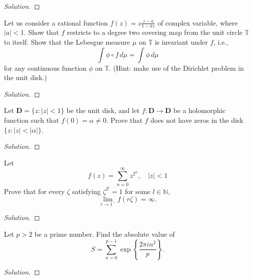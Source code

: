 \documentclass[10pt]{article}
\newenvironment{soln}{\begin{proof}[Solution]}{\end{proof}}
\begin{document}
\begin{soln}

\end{soln}



\begin{problem}
[2007 A-I-6]
Let us consider a rational function $f(z)=z \frac{z-a}{1-\bar{a} z}$ of complex variable, where $|a|<1$. Show that $f$ restricts to a degree two covering map from the unit circle $\mathbb{T}$ to itself. Show that the Lebesgue measure $\mu$ on $\mathbb{T}$ is invariant under $f$, i.e.,
$$
\int \phi \circ f\, d \mu=\int \phi\, d \mu
$$
for any continuous function $\phi$ on $\mathbb{T}$.
(Hint: make use of the Dirichlet problem in the unit disk.)
\end{problem}

\begin{soln}

\end{soln}



\begin{problem}
[2007 A-II-1]
Let $\mathbf{D}=\{z:|z|<1\}$ be the unit disk, and let $f: \mathbf{D} \rightarrow \mathbf{D}$ be a holomorphic function such that $f(0)=\alpha \neq 0$. Prove that $f$ does not have zeros in the disk $\{z:|z|<|\alpha|\}$.
\end{problem}

\begin{soln}

\end{soln}



\begin{problem}
[2006 J-I-2]
Let
$$
f(z)=\sum_{n=0}^{\infty} z^{2^n}, \quad|z|<1
$$
Prove that for every $\zeta$ satisfying $\zeta^{2^l}=1$ for some $l \in \mathbb{N}$,
$$
\lim _{r \rightarrow 1^{-}} f(r \zeta)=\infty .
$$
\end{problem}

\begin{soln}

\end{soln}



\begin{problem}
[2006 J-I-4]
Let $p>2$ be a prime number. Find the absolute value of
$$
S=\sum_{n=0}^{p-1} \exp \left\{\frac{2 \pi i n^2}{p}\right\} .
$$
\end{problem}

\begin{soln}

\end{soln}
\end{document}
